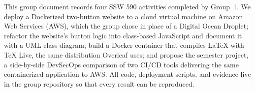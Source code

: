This group document records four SSW 590 activities completed by Group~1. We
deploy a Dockerized two-button website to a cloud virtual machine on Amazon Web
Services (AWS), which the group chose in place of a Digital Ocean Droplet;
refactor the website's button logic into class-based JavaScript and document
it with a UML class diagram; build a Docker container that compiles LaTeX with
TeX Live, the same distribution Overleaf uses; and propose the semester project,
a side-by-side DevSecOps comparison of two CI/CD tools delivering the same
containerized application to AWS. All code, deployment scripts, and evidence
live in the group repository so that every result can be reproduced.
